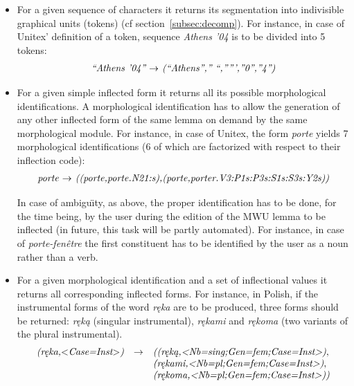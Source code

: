 \begin{itemize}
\item For a given sequence of characters it returns its segmentation into indivisible graphical 
units (tokens) (cf section~\ref{subsec:decomp}). For instance, in case of
Unitex' definition of a token, sequence \emph{Athens '04} is to be divided into
5 tokens:
\[
\begin{array}[l]{l}
\emph{``Athens '04'' $\rightarrow$ (``Athens'','' ``,''''',''0'',''4'')}
\end{array}
\]

\item For a given simple inflected form it returns all its possible morphological 
identifications. A morphological identification has to allow the generation of any 
other inflected form of the same lemma on demand by the same morphological module. 
For instance, in case of Unitex, the form \emph{porte} yields 7 morphological 
identifications (6 of which are factorized with respect to their inflection code):
\[
\begin{array}[l]{l}
\emph{porte $\rightarrow$ ((porte,porte.N21:s),(porte,porter.V3:P1s:P3s:S1s:S3s:Y2s))}
\end{array}
\]

In case of ambigu\"\i ty, as above, the proper identification has to be done, for the time being, 
by the user during the edition of the MWU lemma to be inflected (in future, this task will be 
partly automated). For instance, in case of \emph{porte-fen\^etre} the first constituent has 
to be identified by the user as a noun rather than a verb.

\item For a given morphological identification and a set of inflectional values it returns 
all corresponding inflected forms. For instance, in Polish, if the instrumental forms of the 
word \emph{r\k{e}ka} are to be produced, three forms should be returned: \emph{r\k{e}k\k{a}} 
(singular instrumental), \emph{r\k{e}kami} and  \emph{r\k{e}koma} (two variants of the plural 
instrumental).
\[
\begin{array}[l]{lll}
\emph{(r\k{e}ka,$<$Case=Inst$>$)}&  \rightarrow    & \emph{((r\k{e}k\k{a},<Nb=sing;Gen=fem;Case=Inst>)}, \\
                                    &              & \emph{(r\k{e}kami,<Nb=pl;Gen=fem;Case=Inst>)}, \\
                                    &              & \emph{(r\k{e}koma,<Nb=pl;Gen=fem;Case=Inst>))}
\end{array}
\]
\end{itemize}

